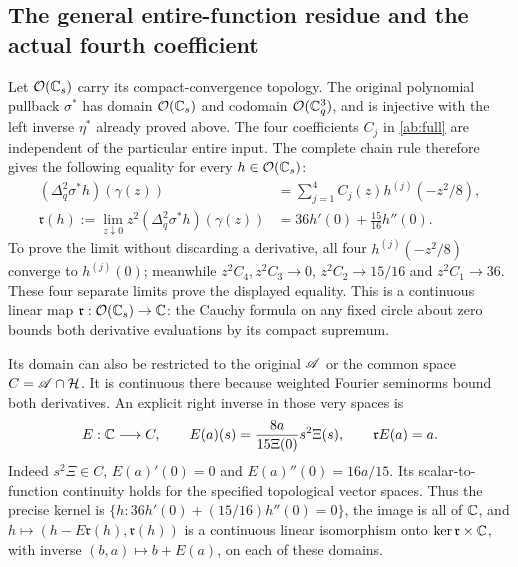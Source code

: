 \subsection{The general entire-function residue and the actual fourth coefficient}
\label{x4b:residue}
Let $\mathcal O(\mathbb C_s)$ carry its compact-convergence topology. The
original polynomial pullback $\sigma^*$ has domain
$\mathcal O(\mathbb C_s)$ and codomain $\mathcal O(\mathbb C_q^3)$, and is
injective with the left inverse $\eta^*$ already proved above.
The four coefficients $C_j$ in \eqref{ab:full} are independent of
the particular entire input. The complete chain rule therefore gives
the following equality for every $h\in\mathcal O(\mathbb C_s)$:
\begin{align}
 (\Delta_q^2\sigma^*h)(\gamma(z))
    &=\sum_{j=1}^4 C_j(z)h^{(j)}(-z^2/8),\label{x4b:allh}\\
 \mathfrak r(h):=
 \lim_{z\downarrow0}z^2(\Delta_q^2\sigma^*h)(\gamma(z))
    &=36h'(0)+\frac{15}{16}h''(0).
    \label{x4b:residue-map}
\end{align}
To prove the limit without discarding a derivative, all four
$h^{(j)}(-z^2/8)$ converge to $h^{(j)}(0)$; meanwhile
$z^2C_4,z^2C_3\to0$, $z^2C_2\to15/16$ and $z^2C_1\to36$.
These four separate limits prove the displayed equality. This is
a continuous linear map $\mathfrak r:\mathcal O(\mathbb C_s)\to\mathbb C$:
the Cauchy formula on any fixed circle about zero bounds both
derivative evaluations by its compact supremum.

Its domain can also be restricted to the original $\mathscr A$ or the common
space $C=\mathscr A\cap\mathcal H$. It is continuous there because weighted
Fourier seminorms bound both derivatives. An explicit right inverse
in those very spaces is
\begin{equation}
 E:\mathbb C\longrightarrow C,\qquad
 E(a)(s)=\frac{8a}{15\Xi(0)}s^2\Xi(s),\qquad
 \mathfrak rE(a)=a.
 \label{x4b:section}
\end{equation}
Indeed $s^2\Xi\in C$, $E(a)'(0)=0$ and $E(a)''(0)=16a/15$.
Its scalar-to-function continuity holds for the specified topological
vector spaces. Thus the precise kernel is
$\{h:36h'(0)+(15/16)h''(0)=0\}$, the image is all of $\mathbb C$, and
$h\mapsto(h-E\mathfrak r(h),\mathfrak r(h))$ is a continuous
linear isomorphism onto $\ker\mathfrak r\times\mathbb C$, with inverse
$(b,a)\mapsto b+E(a)$, on each of these domains.

